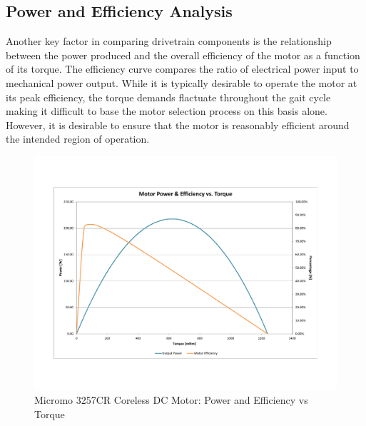 
\subsection{Power and Efficiency Analysis} %
\label{sub:power_and_efficiency_analysis}
Another key factor in comparing drivetrain components is the relationship between the power produced and the overall efficiency of the motor as a function of its torque. The efficiency curve compares the ratio of electrical power input to mechanical power output. While it is typically desirable to operate the motor at its peak efficiency, the torque demands flactuate throughout the gait cycle making it difficult to base the motor selection process on this basis alone. However, it is desirable to ensure that the motor is reasonably efficient around the intended region of operation. 

\begin{figure}[!ht]
	\begin{center}
    \includegraphics[trim = 20mm 30mm 20mm 30mm,clip,width=15cm]{fig/design/motor2.pdf}
	\end{center}
  \caption{Micromo 3257CR Coreless DC Motor: Power and Efficiency vs Torque}
\end{figure}



